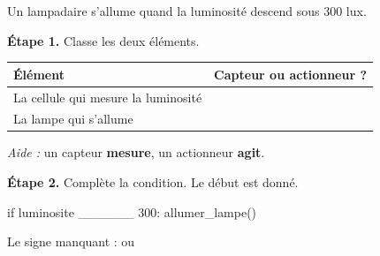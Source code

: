 Un lampadaire s'allume quand la luminosité descend sous $300$ lux.

\bigskip

\textbf{Étape 1.} Classe les deux éléments.

\bigskip

\begin{center}
\begin{tabular}{|l|c|}
\hline
\textbf{Élément} & \textbf{Capteur ou actionneur ?} \\
\hline
La cellule qui mesure la luminosité & \dotfill \\
\hline
La lampe qui s'allume & \dotfill \\
\hline
\end{tabular}
\end{center}

\medskip
\textit{Aide :} un capteur \textbf{mesure}, un actionneur \textbf{agit}.

\bigskip

\textbf{Étape 2.} Complète la condition. Le début est donné.

\begin{python}
if luminosite ______ 300:
    allumer_lampe()
\end{python}

\medskip
Le signe manquant : \fbox{\texttt{<}} \qquad ou \qquad \fbox{\texttt{>}}
